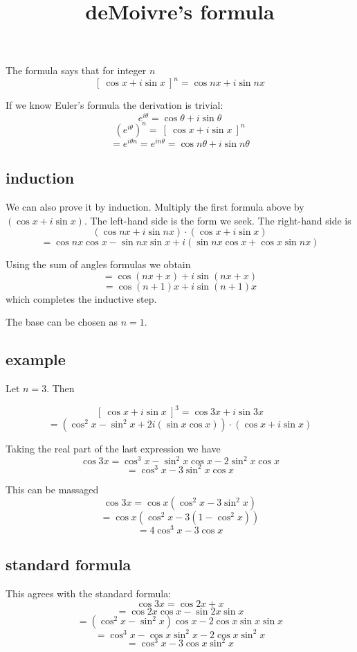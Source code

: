 \documentclass[11pt, oneside]{article}
\title{deMoivre's formula}
\date{}
\begin{document}
\maketitle
\Large


The formula says that for integer $n$
\[ [ \ \cos x + i \sin x \ ]^n = \cos nx + i \sin nx \] 

If we know Euler's formula the derivation is trivial:
\[ e^{i \theta} = \cos \theta + i \sin \theta \]
\[ (e^{i \theta})^n = \ [ \ \cos x + i \sin x \ ]^n \]
\[ = e^{i \theta n}  = e^{in \theta} = \cos n \theta + i \sin n \theta \]

\subsection*{induction}

We can also prove it by induction.  Multiply the first formula above by $(\cos x + i \sin x)$.  The left-hand side is the form we seek.  The right-hand side is
\[ (\cos nx + i \sin nx) \cdot (\cos x + i \sin x) \]
\[ = \cos nx \cos x - \sin nx \sin x + i (\sin nx \cos x + \cos x \sin nx) \]

Using the sum of angles formulas we obtain
\[ = \cos (nx + x) + i \sin (nx + x) \]
\[ = \cos (n+1) x + i \sin (n+1) x \]
which completes the inductive step.

The base can be chosen as $n = 1$.

\subsection*{example}
Let $n = 3$.  Then

\[ [ \ \cos x + i \sin x \ ]^3 = \cos 3x + i \sin 3x \] 
\[ = (\cos^2 x - \sin^2 x + 2i(\sin x \cos x)) \cdot (\cos x + i \sin x) \]

Taking the real part of the last expression we have
\[ \cos 3x = \cos^3 x - \sin^2 x \cos x - 2 \sin^2 x \cos x \]
\[ = \cos^3 x - 3 \sin^2 x \cos x \]

This can be massaged
\[ \cos 3x = \cos x (\cos^2 x - 3 \sin^2 x) \]
\[ = \cos x (\cos^2 x - 3 (1 - \cos^2 x)) \]
\[ = 4 \cos^3 x - 3 \cos x \]

\subsection*{standard formula}
This agrees with the standard formula:
\[ \cos 3x =\cos 2x + x \]
\[ = \cos 2x \cos x - \sin 2x \sin x \]
\[ = (\cos^2 x - \sin^2 x) \cos x - 2 \cos x \sin x \sin x \]
\[ = \cos^3 x - \cos x \sin^2 x - 2 \cos x \sin^2 x \]
\[ = \cos^3 x - 3 \cos x \sin^2 x \]
\end{document}
